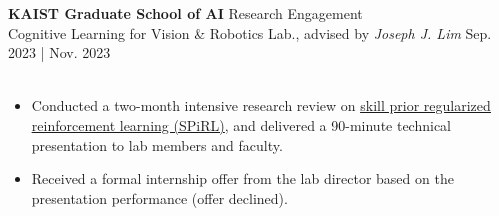 \documentclass[a4paper,10pt]{extarticle}
\begin{document}
\vspace*{0.12cm}
\noindent\textbf{KAIST Graduate School of AI} \hfill Research Engagement\\
Cognitive Learning for Vision \& Robotics Lab., advised by \textsl{Joseph J. Lim} \hfill Sep. 2023 | Nov. 2023\\
\vspace*{-0.25cm}\\
\begin{minipage}{0.77\textwidth}
	\footnotesize
	\begin{itemize}
		\item Conducted a two-month intensive research review on \href{https://clvrai.github.io/spirl/}{\ul{skill prior regularized reinforcement learning (SPiRL)}}, and delivered a 90-minute technical presentation to lab members and faculty.
		\item Received a formal internship offer from the lab director based on the presentation performance (offer declined).
	\end{itemize}
\end{minipage}\\
\end{document}
